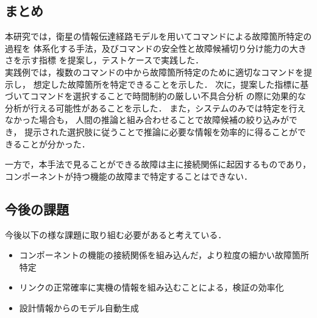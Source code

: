 \documentclass[11pt]{jsarticle}%
\begin{document}
\begin{multicols}{2}
\subsection{まとめ}
\vspace{-1zh}
本研究では，衛星の情報伝達経路モデルを用いてコマンドによる故障箇所特定の過程を
体系化する手法，及びコマンドの安全性と故障候補切り分け能力の大きさを示す指標
を提案し，テストケースで実践した．\\
実践例では，複数のコマンドの中から故障箇所特定のために適切なコマンドを提示し，
想定した故障箇所を特定できることを示した．
次に，提案した指標に基づいてコマンドを選択することで時間制約の厳しい不具合分析
の際に効果的な分析が行える可能性があることを示した．
また，システムのみでは特定を行えなかった場合も，
人間の推論と組み合わせることで故障候補の絞り込みができ，
提示された選択肢に従うことで推論に必要な情報を効率的に得ることができることが分かった．

一方で，本手法で見ることができる故障は主に接続関係に起因するものであり，
コンポーネントが持つ機能の故障まで特定することはできない．
\vspace{-1zh} 
\subsection{今後の課題}
\vspace{-1zh} 
今後以下の様な課題に取り組む必要があると考えている．
\begin{itemize}
  \item コンポーネントの機能の接続関係を組み込んだ，より粒度の細かい故障箇所特定
  \item リンクの正常確率に実機の情報を組み込むことによる，検証の効率化
  \item 設計情報からのモデル自動生成
\end{itemize}

\end{multicols}
\end{document}
